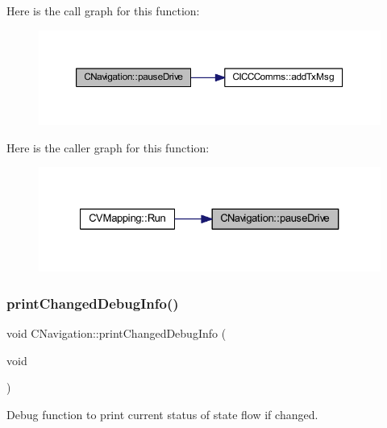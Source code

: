 Here is the call graph for this function\+:
\nopagebreak
\begin{figure}[H]
\begin{center}
\leavevmode
\includegraphics[width=350pt]{class_c_navigation_a27649dc6324360829d42aea67e88e3ee_cgraph}
\end{center}
\end{figure}
Here is the caller graph for this function\+:
\nopagebreak
\begin{figure}[H]
\begin{center}
\leavevmode
\includegraphics[width=327pt]{class_c_navigation_a27649dc6324360829d42aea67e88e3ee_icgraph}
\end{center}
\end{figure}
\mbox{\label{class_c_navigation_ac491c77788ba2e953a704b6ad622a665}} 
\subsubsection{\texorpdfstring{printChangedDebugInfo()}{printChangedDebugInfo()}}
{\footnotesize\ttfamily void C\+Navigation\+::print\+Changed\+Debug\+Info (\begin{DoxyParamCaption}\item[{void}]{ }\end{DoxyParamCaption})\hspace{0.3cm}{\ttfamily [virtual]}}



Debug function to print current status of state flow if changed. 



